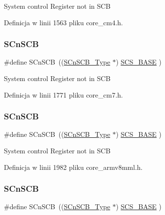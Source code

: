 System control Register not in S\+CB 

Definicja w linii 1563 pliku core\+\_\+cm4.\+h.

\mbox{\label{group___c_m_s_i_s__core__base_ga9fe0cd2eef83a8adad94490d9ecca63f}} 
\subsubsection{\texorpdfstring{S\+Cn\+S\+CB}{SCnSCB}\hspace{0.1cm}{\footnotesize\ttfamily [6/8]}}
{\footnotesize\ttfamily \#define S\+Cn\+S\+CB~((\hyperlink{struct_s_cn_s_c_b___type}{S\+Cn\+S\+C\+B\+\_\+\+Type}    $\ast$)     \hyperlink{group___c_m_s_i_s__core__base_ga3c14ed93192c8d9143322bbf77ebf770}{S\+C\+S\+\_\+\+B\+A\+SE}      )}

System control Register not in S\+CB 

Definicja w linii 1771 pliku core\+\_\+cm7.\+h.

\mbox{\label{group___c_m_s_i_s__core__base_ga9fe0cd2eef83a8adad94490d9ecca63f}} 
\subsubsection{\texorpdfstring{S\+Cn\+S\+CB}{SCnSCB}\hspace{0.1cm}{\footnotesize\ttfamily [7/8]}}
{\footnotesize\ttfamily \#define S\+Cn\+S\+CB~((\hyperlink{struct_s_cn_s_c_b___type}{S\+Cn\+S\+C\+B\+\_\+\+Type}    $\ast$)     \hyperlink{group___c_m_s_i_s__core__base_ga3c14ed93192c8d9143322bbf77ebf770}{S\+C\+S\+\_\+\+B\+A\+SE}         )}

System control Register not in S\+CB 

Definicja w linii 1982 pliku core\+\_\+armv8mml.\+h.

\mbox{\label{group___c_m_s_i_s__core__base_ga9fe0cd2eef83a8adad94490d9ecca63f}} 
\subsubsection{\texorpdfstring{S\+Cn\+S\+CB}{SCnSCB}\hspace{0.1cm}{\footnotesize\ttfamily [8/8]}}
{\footnotesize\ttfamily \#define S\+Cn\+S\+CB~((\hyperlink{struct_s_cn_s_c_b___type}{S\+Cn\+S\+C\+B\+\_\+\+Type}    $\ast$)     \hyperlink{group___c_m_s_i_s__core__base_ga3c14ed93192c8d9143322bbf77ebf770}{S\+C\+S\+\_\+\+B\+A\+SE}         )}

